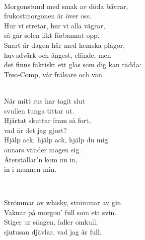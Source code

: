 

 \\       

\songtext{}Morgonstund med smak av döda bävrar,\\
frukostmorgonen är över oss.\\
Hur vi stretar, hur vi alla vägrar,\\
så går solen likt förbannat opp.\\
Snart är dagen här med hemska plågor,\\
huvudvärk och ångest, elände, men\\
det finns faktiskt ett glas som dig kan rädda:\\
Treo-Comp, vår frälsare och vän.\\


 \\

\songtext{}När mitt rus har tagit slut\\
svullen tunga tittar ut.\\
Hjärtat skuttar fram så fort,\\
vad är det jag gjort?\\
Hjälp ack, hjälp ack, hjälp du mig\\
annars vänder magen sig.\\
Återställar'n kom nu in,\\
in i munnen min.\\

\newpage


 \\       

\songtext{} Strömmar av whisky, strömmar av gin.\\   
Vaknar på morgon' full som ett svin.\\   
Stiger ur sängen, faller omkull,\\   
sjutusan djävlar, vad jag är full.\\   



 \\       


